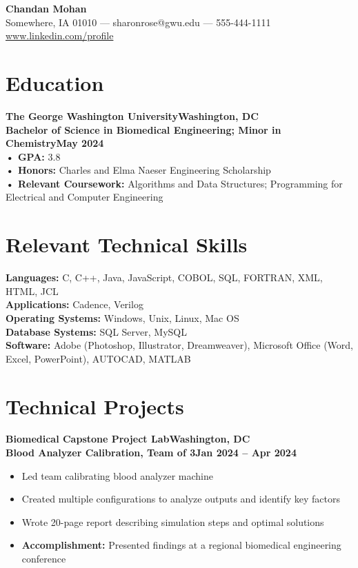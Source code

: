 \documentclass[10pt]{article}
\begin{document}
\begin{center}
    {\fontsize{12pt}{12pt}\bfseries Chandan Mohan}\\[2pt]
    Somewhere, IA 01010 --- sharonrose@gwu.edu --- 555-444-1111\\
    \href{http://www.linkedin.com/profile}{www.linkedin.com/profile}
\end{center}

\section*{Education}
\textbf{The George Washington University}\hfill \textbf{Washington, DC}\\
\textbf{Bachelor of Science in Biomedical Engineering; Minor in Chemistry}\hfill \textbf{May 2024}\\
\textbf{• GPA:} 3.8\\
\textbf{• Honors:} Charles and Elma Naeser Engineering Scholarship\\
\textbf{• Relevant Coursework:} Algorithms and Data Structures; Programming for Electrical and Computer Engineering

\section*{Relevant Technical Skills}
\textbf{Languages:} C, C++, Java, JavaScript, COBOL, SQL, FORTRAN, XML, HTML, JCL\\
\textbf{Applications:} Cadence, Verilog\\
\textbf{Operating Systems:} Windows, Unix, Linux, Mac OS\\
\textbf{Database Systems:} SQL Server, MySQL\\
\textbf{Software:} Adobe (Photoshop, Illustrator, Dreamweaver), Microsoft Office (Word, Excel, PowerPoint), AUTOCAD, MATLAB

\section*{Technical Projects}
\textbf{Biomedical Capstone Project Lab}\hfill \textbf{Washington, DC}\\
\textbf{Blood Analyzer Calibration, Team of 3}\hfill \textbf{Jan 2024 -- Apr 2024}
\begin{itemize}
    \item Led team calibrating blood analyzer machine
    \item Created multiple configurations to analyze outputs and identify key factors
    \item Wrote 20-page report describing simulation steps and optimal solutions
    \item \textbf{Accomplishment:} Presented findings at a regional biomedical engineering conference
\end{itemize}
\end{document}
